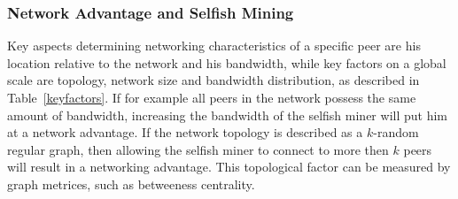 \subsubsection{Network Advantage and Selfish Mining}
Key aspects determining networking characteristics of a specific peer are his location relative to the network and his bandwidth, while key factors on a global scale are topology, network size and bandwidth distribution, as described in Table~\ref{keyfactors}. If for example all peers in the network possess the same amount of bandwidth, increasing the bandwidth of the selfish miner will put him at a network advantage.
If the network topology is described as a $k$-random regular graph, then allowing the selfish miner to connect to more then $k$ peers will result in a networking advantage. This topological factor can be measured by graph metrices, such as betweeness centrality.

